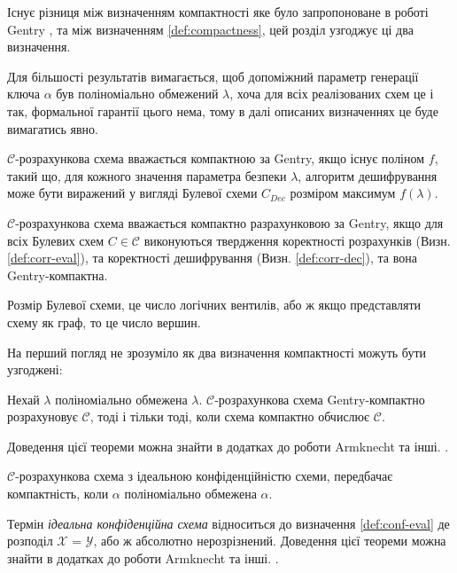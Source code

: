 Існує різниця між визначенням компактності яке було запропоноване в роботі Gentry 
\cite{homenc}, та між визначенням \ref{def:compactness}, цей розділ узгоджує ці два
визначення.

Для більшості результатів вимагається, щоб допоміжний параметр генерації ключа \(\alpha\)
був поліноміально обмежений \(\lambda\), хоча для всіх реалізованих схем це і так, 
формальної гарантії цього нема, тому в далі описаних визначеннях це буде вимагатись явно.

\begin{definition}
    \(\mathcal{C}\)-розрахункова схема вважається компактною за Gentry, якщо існує
    поліном \(f\), такий що, для кожного значення параметра безпеки \(\lambda\), алгоритм
    дешифрування може бути виражений у вигляді Булевої схеми \(C_{Dec}\) розміром максимум
    \(f(\lambda)\).
\end{definition}

\begin{definition}
\(\mathcal{C}\)-розрахункова схема вважається компактно разрахунковою за Gentry, якщо
для всіх Булевих схем \(C \in \mathcal{C}\) виконуються твердження коректності розрахунків
(Визн. \ref{def:corr-eval}), та коректності дешифрування (Визн. \ref{def:corr-dec}), та вона 
Gentry-компактна.
\end{definition}

Розмір Булевої схеми, це число логічних вентилів, або ж якщо представляти схему як граф, то
це число вершин.

На перший погляд не зрозуміло як два визначення компактності можуть бути узгоджені:
\begin{theorem}
    Нехай \(\lambda\) поліноміально обмежена \(\lambda\). \(\mathcal{C}\)-розрахункова
    схема Gentry-компактно розрахуновує \(\mathcal{C}\), тоді і тільки тоді, коли схема
    компактно обчислює \(\mathcal{C}\).
\end{theorem}
Доведення цієї теореми можна знайти в додатках до роботи Armknecht та інші. \cite{cryptoeprint:2015/1192}.

\begin{theorem}
    \label{theorem:ideal-conf-compactness}
    \(\mathcal{C}\)-розрахункова схема з ідеальною конфіденційністю схеми, передбачає
    компактність, коли \(\alpha\) поліноміально обмежена \(\alpha\).
\end{theorem}
Термін \emph{ідеальна конфіденційна схема} відноситься до визначення \ref{def:conf-eval} де
розподіл \(\mathcal{X}\) = \(\mathcal{Y}\), або ж абсолютно нерозрізнений.
Доведення цієї теореми можна знайти в додатках до роботи Armknecht та інші. \cite{cryptoeprint:2015/1192}.

